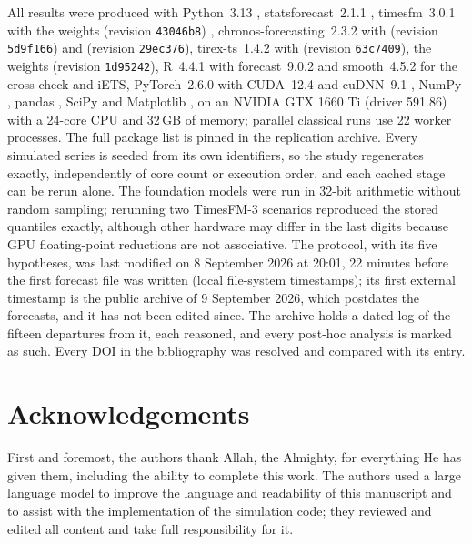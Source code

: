 \documentclass[ASNA]{USG}
\newcommand{\pkg}[1]{\textsf{#1}}
\newcommand{\proglang}[1]{\textsf{#1}}
\newcommand{\code}[1]{\texttt{#1}}
\begin{document}
All results were produced with \proglang{Python}~3.13 \citep{python}, \pkg{statsforecast}~2.1.1
\citep{statsforecast}, \pkg{timesfm}~3.0.1 with the  weights (revision
\code{43046b8}) \citep{timesfm3repo}, \pkg{chronos-forecasting}~2.3.2 with 
(revision \code{5d9f166}) and  (revision \code{29ec376}), \pkg{tirex-ts}~1.4.2 with
 (revision \code{63c7409}), the  weights (revision
\code{1d95242}), \proglang{R}~4.4.1 with \pkg{forecast}~9.0.2 and \pkg{smooth}~4.5.2 for the cross-check and iETS,
\pkg{PyTorch}~2.6.0 with CUDA~12.4 and cuDNN~9.1 \citep{paszke2019pytorch}, \pkg{NumPy}
\citep{harris2020numpy}, \pkg{pandas} \citep{mckinney2010pandas}, \pkg{SciPy} \citep{virtanen2020scipy} and
\pkg{Matplotlib} \citep{hunter2007matplotlib}, on an NVIDIA GTX 1660 Ti (driver 591.86) with a 24-core CPU
and 32\,GB of memory; parallel classical runs use 22 worker processes. The full package list is pinned in the
replication archive. Every simulated series is seeded from its own identifiers, so the study regenerates
exactly, independently of core count or execution order, and each cached stage can be rerun alone. The
foundation models were run in 32-bit arithmetic without random sampling; rerunning two TimesFM-3 scenarios
reproduced the stored quantiles exactly, although other hardware may differ in the last digits because GPU
floating-point reductions are not associative. The protocol, with its five hypotheses, was last modified on 8
September 2026 at 20:01, 22 minutes before the first forecast file was written (local file-system
timestamps); its first external timestamp is the public archive of 9 September 2026, which postdates the
forecasts, and it has not been edited since. The archive holds a dated log of the fifteen departures from
it, each reasoned, and every post-hoc analysis is marked as such. Every DOI in the
bibliography was resolved and compared with its entry.



\section*{Acknowledgements}
First and foremost, the authors thank Allah, the Almighty, for everything He has given them, including
the ability to complete this work. The authors used a large language model to improve the language and
readability of this manuscript and to assist with the implementation of the simulation code; they
reviewed and edited all content and take full responsibility for it.
\end{document}
